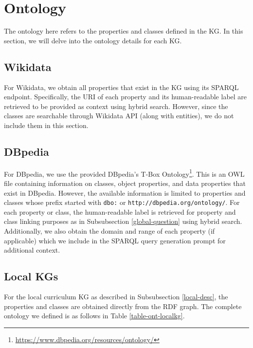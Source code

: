 

\section{Ontology}
The ontology here refers to the properties and classes defined in the KG. In this section, we will delve into the ontology details for each KG.

\subsection{Wikidata}
For Wikidata, we obtain all properties that exist in the KG using its SPARQL endpoint. Specifically, the URI of each property and its human-readable label are retrieved to be provided as context using hybrid search. However, since the classes are searchable through Wikidata API (along with entities), we do not include them in this section.

\subsection{DBpedia}
For DBpedia, we use the provided DBpedia's T-Box Ontology\footnote{\url{https://www.dbpedia.org/resources/ontology/}}. This is an OWL file containing information on classes, object properties, and data properties that exist in DBpedia. However, the available information is limited to properties and classes whose prefix started with \texttt{dbo:} or \texttt{http://dbpedia.org/ontology/}. For each property or class, the human-readable label is retrieved for property and class linking purposes as in Subsubsection \ref{global-question} using hybrid search. Additionally, we also obtain the domain and range of each property (if applicable) which we include in the SPARQL query generation prompt for additional context.

\subsection{Local KGs}
\label{ontology-local}
For the local curriculum KG as described in Subsubsection \ref{local-desc}, the properties and classes are obtained directly from the RDF graph. The complete ontology we defined is as follows in Table \ref{table-ont-localkg}.

